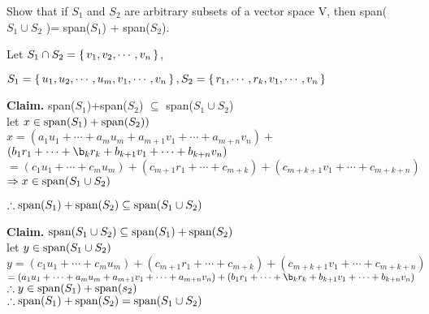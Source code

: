 Show that if $S_1$ and $S_2$ are arbitrary subsets of a vector space $\mathrm{V}$, then span($S_1 \cup S_2$ )= span($S_1$) + span($S_2$).

\begin{tcolorbox}
	\begin{solution}
	
		Let $S_1 \cap S_2 = \left\{ \,v_1,v_2,\cdots , v_n \,\right\}$,
		
		$S_1 = \left\{ \,u_1,u_2,\cdots,u_m,v_1,\cdots,v_n \,\right\} , S_2 = \left\{ \,r_1,\cdots,r_k,v_{1}, \cdots,v_{n} \,\right\}$  
		
		\textbf{Claim.} span($S_1$)+span($S_2$) $\subseteq$ span($S_1 \cup S_2$)\\
		let $x \in \text{span($S_1$)}+\text{span($S_2$)})$\\
		$x = (a_1u_1+ \cdots +a_mu_m+a_{m+1}v_1+\cdots + a_{m+n}v_{n})+$\\$(b_1r_1+\cdots+\b_kr_k + b_{k+1}v_1 + \cdots + b_{k+n}v_n)$\\
		$=(c_1u_1 + \cdots + c_mu_m)+(c_{m+1}r_1+ \cdots + c_{m+k})+(c_{m+k+1}v_1 + \cdots + c_{m+k+n})$
		$\Rightarrow x \in \text{span($S_1 \cup S_2$)}$
		
		$\therefore \text{span($S_1$)} + \text{span($S_2$)} \subseteq \text{span($S_1 \cup S_2$)} $
		
		\textbf{Claim.} $\text{span($S_1 \cup S_2$)} \subseteq \text{span($S_1$)} + \text{span($S_2$)}$\\
		let $y \in \text{span($S_1 \cup S_2$)}$\\
		$y = (c_1u_1 + \cdots + c_mu_m)+(c_{m+1}r_1+ \cdots + c_{m+k})+(c_{m+k+1}v_1 + \cdots + c_{m+k+n})$\\
		$= (a_1u_1+ \cdots +a_mu_m+a_{m+1}v_1+\cdots + a_{m+n}v_{n}) + (b_1r_1+\cdots+\b_kr_k + b_{k+1}v_1 + \cdots + b_{k+n}v_n)$\\
		$\therefore y \in \text{span($S_1$)} + \text{span($s_2$)}$\\
		$\therefore \text{span($S_1$)} + \text{span($S_2$)} = \text{span($S_1 \cup S_2$)}$
		
	\end{solution}
\end{tcolorbox}